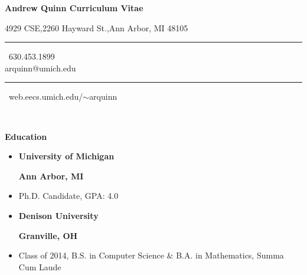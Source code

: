 \documentclass[letterpaper,11pt]{article}
\makeatletter
\def \name {Andrew Quinn Curriculum Vitae}
\def \officeaddr {4929 CSE,2260 Hayward St.,Ann Arbor, MI 48105}
\def \phone {630.453.1899}
\def \email {arquinn@umich.edu}
\def \website {web.eecs.umich.edu/$\sim$arquinn}
\newcommand{\resheading}[1]{{\large \colorbox{mygrey}{\begin{minipage}{\textwidth}{\textbf{#1\vphantom{p\^{E}}}}\end{minipage}}}}
\newcommand{\heading}[4]{
\vspace{#1}
\begin{minipage}{8cm}
\flushleft
\textbf{#2}
\end{minipage}
\null\hfill
\begin{minipage}{7cm}
\flushright 
\textbf{#3}
\end{minipage}
\vspace{#4}
}
\newcommand{\blkSquare}{\ \rule[.2ex]{1ex}{1ex}\ }
\newcommand{\myTitle}{
\textbf{{\LARGE \name}} \\
{\footnotesize \officeaddr \blkSquare \phone \\ \email \blkSquare \website} \\
\vspace{0.1in}}
\makeatother
\begin{document}
\myTitle %

\resheading{Education}
\begin{itemize}
	\item[] \heading{0em}{University of Michigan}{Ann Arbor, MI}{.25em}
	\item[] Ph.D. Candidate, GPA: 4.0
	\item[] \heading{0em}{Denison University}{Granville,
          OH}{.25em}
	\item[]  Class of 2014, B.S. in Computer Science \& B.A. in Mathematics, Summa Cum Laude
\end{itemize}
\end{document}
